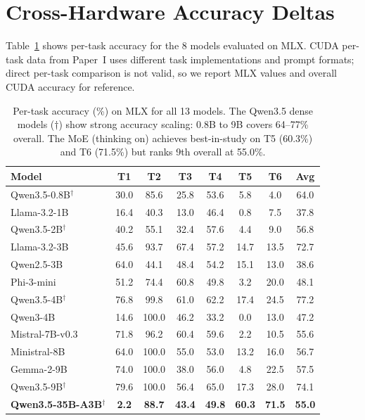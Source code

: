 \documentclass[11pt]{article}
\begin{document}
\section{Cross-Hardware Accuracy Deltas}
\label{app:accuracy-deltas}

Table~\ref{tab:app-accuracy-delta} shows per-task accuracy for the 8 models evaluated on MLX.  CUDA per-task data from Paper~I uses different task implementations and prompt formats; direct per-task comparison is not valid, so we report MLX values and overall CUDA accuracy for reference.

\begin{table}[t]
\centering
\caption{Per-task accuracy (\%) on MLX for all 13 models.  The Qwen3.5 dense models ($\dagger$) show strong accuracy scaling: 0.8B to 9B covers 64--77\% overall.  The MoE (thinking on) achieves best-in-study on T5 (60.3\%) and T6 (71.5\%) but ranks 9th overall at 55.0\%.}
\label{tab:app-accuracy-delta}
\small
\begin{tabular}{l cccccc c}
\toprule
\textbf{Model} & \textbf{T1} & \textbf{T2} & \textbf{T3} & \textbf{T4} & \textbf{T5} & \textbf{T6} & \textbf{Avg} \\
\midrule
Qwen3.5-0.8B$^\dagger$ & 30.0 & 85.6 & 25.8 & 53.6 & 5.8 & 4.0 & 64.0 \\
Llama-3.2-1B & 16.4 & 40.3 & 13.0 & 46.4 & 0.8 & 7.5 & 37.8 \\
Qwen3.5-2B$^\dagger$ & 40.2 & 55.1 & 32.4 & 57.6 & 4.4 & 9.0 & 56.8 \\
Llama-3.2-3B & 45.6 & 93.7 & 67.4 & 57.2 & 14.7 & 13.5 & 72.7 \\
Qwen2.5-3B & 64.0 & 44.1 & 48.4 & 54.2 & 15.1 & 13.0 & 38.6 \\
Phi-3-mini & 51.2 & 74.4 & 60.8 & 49.8 & 3.2 & 20.0 & 48.1 \\
Qwen3.5-4B$^\dagger$ & 76.8 & 99.8 & 61.0 & 62.2 & 17.4 & 24.5 & 77.2 \\
Qwen3-4B & 14.6 & 100.0 & 46.2 & 33.2 & 0.0 & 13.0 & 47.2 \\
Mistral-7B-v0.3 & 71.8 & 96.2 & 60.4 & 59.6 & 2.2 & 10.5 & 55.6 \\
Ministral-8B & 64.0 & 100.0 & 55.0 & 53.0 & 13.2 & 16.0 & 56.7 \\
Gemma-2-9B & 74.0 & 100.0 & 38.0 & 56.0 & 4.8 & 22.5 & 57.5 \\
Qwen3.5-9B$^\dagger$ & 79.6 & 100.0 & 56.4 & 65.0 & 17.3 & 28.0 & 74.1 \\
\midrule
\rowcolor{moepurple!8}
\textbf{Qwen3.5-35B-A3B}$^\dagger$ & \textbf{2.2} & \textbf{88.7} & \textbf{43.4} & \textbf{49.8} & \textbf{60.3} & \textbf{71.5} & \textbf{55.0} \\
\bottomrule
\end{tabular}
\end{table}
\end{document}
